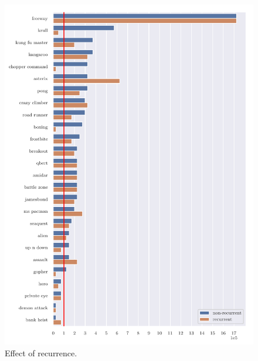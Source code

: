 \begin{figure}
\centering
\includegraphics[width=0.9\columnwidth]{figures/graph_Effect_of_a_recurrent_architecture.pdf}
\caption{Effect of recurrence.}
\label{fig:comp_recurr}
\end{figure}

